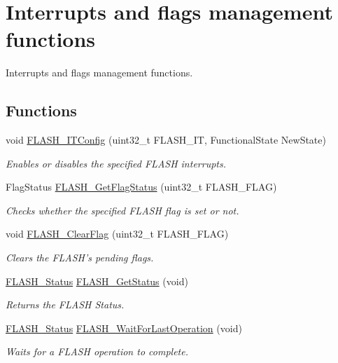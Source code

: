 \hypertarget{group___f_l_a_s_h___group4}{}\section{Interrupts and flags management functions}
\label{group___f_l_a_s_h___group4}


Interrupts and flags management functions.  


\subsection*{Functions}
\begin{DoxyCompactItemize}
\item 
void \hyperlink{group___f_l_a_s_h___group4_ga94c1e51a9c3bf8d48eb6eb4a4d054861}{F\+L\+A\+S\+H\+\_\+\+I\+T\+Config} (uint32\+\_\+t F\+L\+A\+S\+H\+\_\+\+I\+T, Functional\+State New\+State)
\begin{DoxyCompactList}\small\item\em Enables or disables the specified F\+L\+A\+S\+H interrupts. \end{DoxyCompactList}\item 
Flag\+Status \hyperlink{group___f_l_a_s_h___group4_gae3fb545e32f21501ca27d4380e0f2088}{F\+L\+A\+S\+H\+\_\+\+Get\+Flag\+Status} (uint32\+\_\+t F\+L\+A\+S\+H\+\_\+\+F\+L\+A\+G)
\begin{DoxyCompactList}\small\item\em Checks whether the specified F\+L\+A\+S\+H flag is set or not. \end{DoxyCompactList}\item 
void \hyperlink{group___f_l_a_s_h___group4_gac4be1d486483fa5cd70ec77d44ca8f87}{F\+L\+A\+S\+H\+\_\+\+Clear\+Flag} (uint32\+\_\+t F\+L\+A\+S\+H\+\_\+\+F\+L\+A\+G)
\begin{DoxyCompactList}\small\item\em Clears the F\+L\+A\+S\+H's pending flags. \end{DoxyCompactList}\item 
\hyperlink{group___f_l_a_s_h_gadc63a6f3404ff1f71229a66915e9cdc0}{F\+L\+A\+S\+H\+\_\+\+Status} \hyperlink{group___f_l_a_s_h___group4_gac265b8d1e7ea11e44ceee28797c3debb}{F\+L\+A\+S\+H\+\_\+\+Get\+Status} (void)
\begin{DoxyCompactList}\small\item\em Returns the F\+L\+A\+S\+H Status. \end{DoxyCompactList}\item 
\hyperlink{group___f_l_a_s_h_gadc63a6f3404ff1f71229a66915e9cdc0}{F\+L\+A\+S\+H\+\_\+\+Status} \hyperlink{group___f_l_a_s_h___group4_gaaf8ea3b00c9a5f5eca0df9a795b83f22}{F\+L\+A\+S\+H\+\_\+\+Wait\+For\+Last\+Operation} (void)
\begin{DoxyCompactList}\small\item\em Waits for a F\+L\+A\+S\+H operation to complete. \end{DoxyCompactList}\end{DoxyCompactItemize}


